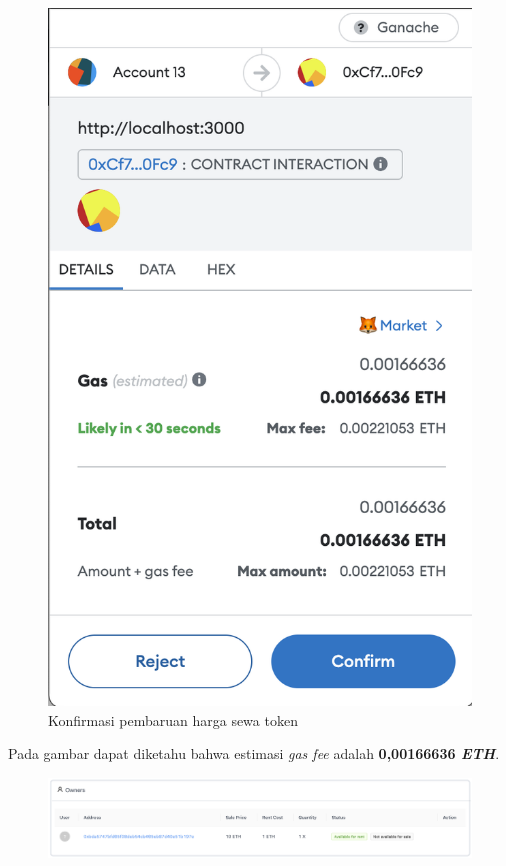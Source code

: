 \begin{itemize}
\begin{figure} [H]
        \includegraphics[scale=0.3]{gambar/img-test-share-put-item-for-rent-2-1.png}
        \caption{Konfirmasi pembaruan harga sewa token}
        \label{fig:TestShareKonfirmasiPembaruanPenyewa2-1}
      \end{figure}
      Pada gambar dapat diketahu bahwa estimasi \emph{gas fee} adalah \textbf{0,00166636 \emph{ETH}}.
      \begin{figure} [H] \centering
        \includegraphics[scale=0.3]{gambar/img-test-share-put-item-for-rent-2-2.png}

\end{figure}
\end{itemize}

